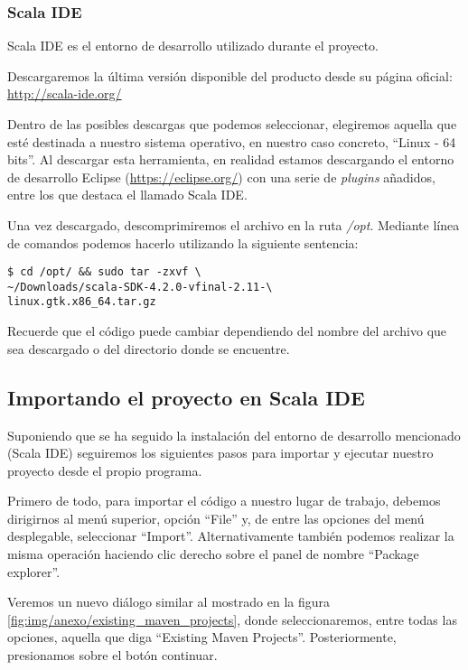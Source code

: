 \subsubsection{Scala IDE}

Scala IDE es el entorno de desarrollo utilizado durante el proyecto.

Descargaremos la  última versión disponible del producto desde su página oficial: \url{http://scala-ide.org/}

Dentro de las posibles descargas que podemos seleccionar, elegiremos aquella que esté destinada a nuestro sistema operativo, en nuestro caso concreto, ``Linux - 64 bits''. Al descargar esta herramienta, en realidad estamos descargando el entorno de desarrollo Eclipse (\url{https://eclipse.org/}) con una serie de \textit{plugins} añadidos, entre los que destaca el llamado Scala IDE.

Una vez descargado, descomprimiremos el archivo en la ruta \textit{/opt}. Mediante línea de comandos podemos hacerlo utilizando la siguiente sentencia:

\begin{lstlisting}
$ cd /opt/ && sudo tar -zxvf \
~/Downloads/scala-SDK-4.2.0-vfinal-2.11-\
linux.gtk.x86_64.tar.gz
\end{lstlisting}

Recuerde que el código puede cambiar dependiendo del nombre del archivo que sea descargado o del directorio donde se encuentre.

\subsection{Importando el proyecto en Scala IDE}


Suponiendo que se ha seguido la instalación del entorno de desarrollo mencionado (Scala IDE) seguiremos los siguientes pasos para importar y ejecutar nuestro proyecto desde el propio programa.

Primero de todo, para importar el código a nuestro lugar de trabajo, debemos dirigirnos al menú superior, opción ``File'' y, de entre las opciones del menú desplegable, seleccionar ``Import''. Alternativamente también podemos realizar la misma operación haciendo clic derecho sobre el panel de nombre ``Package explorer''.

Veremos un nuevo diálogo similar al mostrado en la figura \ref{fig:img/anexo/existing_maven_projects}, donde seleccionaremos, entre todas las opciones, aquella que diga ``Existing Maven Projects''. Posteriormente, presionamos sobre el botón continuar.

